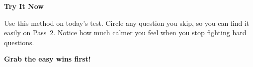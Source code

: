 {\begin{tcolorbox}[
    enhanced,
    colback=funYellowLight,
    colframe=funYellow!60,
    arc=10pt,
    boxrule=1pt,
    left=6mm, right=6mm, top=4mm, bottom=4mm,
]
{\bfseries\color{funYellowDark} \faLightbulb\hspace{2mm}Try It Now}

\vspace{2mm}

Use this method on today's test. Circle any question you skip, so you can find it easily on Pass~2. Notice how much calmer you feel when you stop fighting hard questions.
\end{tcolorbox}

\vspace{4mm}

\begin{center}
{\large\bfseries\color{funOrangeDark} \faCheckDouble\hspace{2mm}Grab the easy wins first!\hspace{2mm}\faCheckDouble}
\end{center}

}
\newpage
